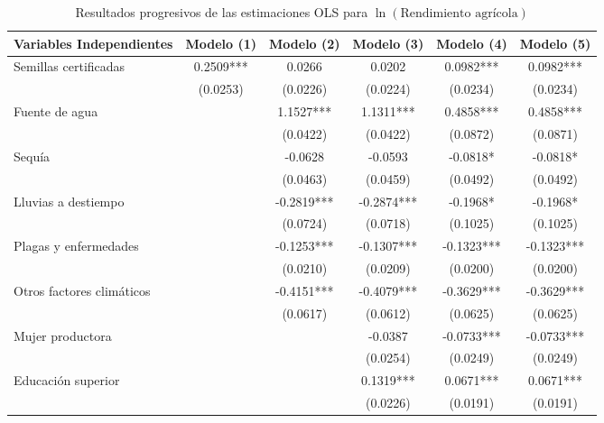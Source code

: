 \documentclass[11pt,a4paper,twocolumn]{article}
\begin{document}
\begin{table}[t]
\raggedright 
\scriptsize 
\caption{Resultados progresivos de las estimaciones OLS para $\ln(\text{Rendimiento agrícola})$ }
\label{tab:resultados}
\begin{tabular*}{\textwidth}{@{\extracolsep{\fill}}lccccc@{}}
\toprule
\textbf{Variables Independientes} & \textbf{Modelo (1)} & \textbf{Modelo (2)} & \textbf{Modelo (3)} & \textbf{Modelo (4)} & \textbf{Modelo (5)} \\
\midrule
Semillas certificadas		& 0.2509*** & 0.0266 & 0.0202 & 0.0982*** & {0.0982***} \\
                            & (0.0253)  & (0.0226) & (0.0224) & (0.0234)  & {(0.0234)} \\
Fuente de agua              &           & 1.1527*** & 1.1311*** & 0.4858*** & {0.4858***} \\
                            &           & (0.0422) & (0.0422) & (0.0872)  & {(0.0871)} \\
Sequía                      &           & -0.0628  & -0.0593  & -0.0818*  & {-0.0818*} \\
                            &           & (0.0463) & (0.0459) & (0.0492)  & {(0.0492)} \\
Lluvias a destiempo         &           & -0.2819*** & -0.2874*** & -0.1968* & {-0.1968*} \\
                            &           & (0.0724) & (0.0718) & (0.1025)  & {(0.1025)} \\
Plagas y enfermedades       &           & -0.1253*** & -0.1307*** & -0.1323*** & {-0.1323***} \\
                            &           & (0.0210) & (0.0209) & (0.0200)  & {(0.0200)} \\
Otros factores climáticos   &           & -0.4151*** & -0.4079*** & -0.3629*** & {-0.3629***} \\
                            &           & (0.0617) & (0.0612) & (0.0625)  & {(0.0625)} \\
Mujer productora            &           &          & -0.0387  & -0.0733*** & {-0.0733***} \\
                            &           &          & (0.0254) & (0.0249)  & {(0.0249)} \\
Educación superior          &           &          & 0.1319*** & 0.0671*** & {0.0671***} \\
                            &           &          & (0.0226) & (0.0191)  & {(0.0191)} \\

\end{tabular*}
\end{table}
\end{document}
